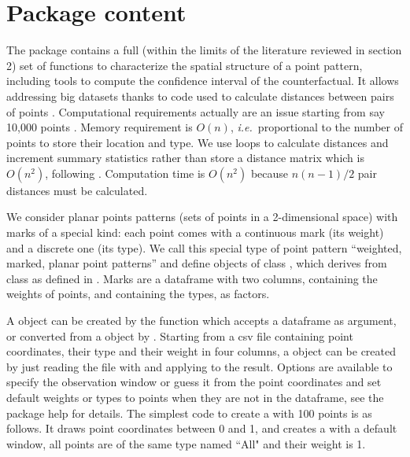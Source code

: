 \documentclass[nojss]{jss}
\begin{document}
\section{Package content}

The  package contains a full (within the limits of the literature reviewed in section 2) set of functions to characterize the spatial structure of a point pattern, including tools to compute the confidence interval of the counterfactual.
It allows addressing big datasets thanks to  code used to calculate distances between pairs of points \citep[using  and  infrastructure][]{Eddelbuettel2011, Allaire2015}. Computational requirements actually are an issue starting from say 10,000 points \citep[see][for instance]{Ellison2010}. Memory requirement is $O(n)$, \emph{i.e.}\ proportional to the number of points to store their location and type. We use loops to calculate distances and increment summary statistics rather than store a distance matrix which is $O(n^2)$, following \cite{Scholl2013}. Computation time is $O(n^2)$ because $n(n-1)/2$ pair distances must be calculated.

We consider planar points patterns (sets of points in a 2-dimensional space) with marks of a special kind: each point comes with a continuous mark (its weight) and a discrete one (its type). We call this special type of point pattern ``weighted, marked, planar point patterns'' and define objects of class , which derives from  class as defined in . Marks are a dataframe with two columns,  containing the weights of points, and  containing the types, as factors.

A  object can be created by the  function which accepts a dataframe as argument, or converted from a  object by . Starting from a csv file containing point coordinates, their type and their weight in four columns, a  object can be created by just reading the file with  and applying  to the result. Options are available to specify the observation window or guess it from the point coordinates and set default weights or types to points when they are not in the dataframe, see the package help for details. The simplest code to create a  with 100 points is as follows. It draws point coordinates between 0 and 1, and creates a  with a default window, all points are of the same type named ``All" and their weight is 1.
\end{document}

